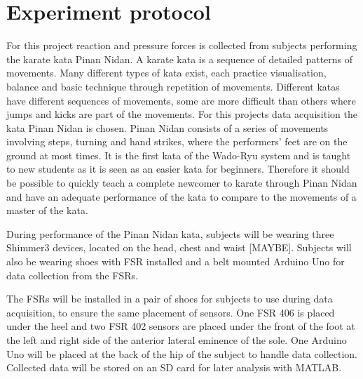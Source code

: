 \section{Experiment protocol} %
For this project reaction and pressure forces is collected from subjects performing the karate kata Pinan Nidan. %
A karate kata is a sequence of detailed patterns of movements. Many different types of kata exist, each practice visualisation, balance and basic technique through repetition of movements. Different katas have different sequences of movements, some are more difficult than others where jumps and kicks are part of the movements. For this projects data acquisition the kata Pinan Nidan is chosen. Pinan Nidan consists of a series of movements involving steps, turning and hand strikes, where the performers' feet are on the ground at most times. It is the first kata of the Wado-Ryu system and is taught to new students as it is seen as an easier kata for beginners. \cite{Mccarthy1987, Dojo2018} Therefore it should be possible to quickly teach a complete newcomer to karate through Pinan Nidan and have an adequate performance of the kata to compare to the movements of a master of the kata. 

During performance of the Pinan Nidan kata, subjects will be wearing three Shimmer3 devices, located on the head, chest and waist [MAYBE]. Subjects will also be wearing shoes with FSR installed and a belt mounted Arduino Uno for data collection from the FSRs. 

The FSRs will be installed in a pair of shoes for subjects to use during data acquisition, to ensure the same placement of sensors. One FSR 406 is placed under the heel and two FSR 402 sensors are placed under the front of the foot at the left and right side of the anterior lateral eminence of the sole. One Arduino Uno will be placed at the back of the hip of the subject to handle data collection. Collected data will be stored on an SD card for later analysis with MATLAB. 



